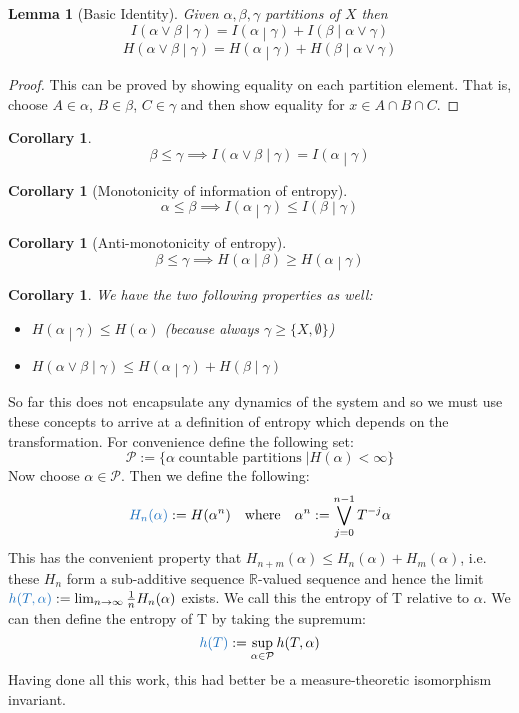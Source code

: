 \documentclass[11pt]{article}
\newcommand{\defeq}{:=}
\newcommand{\relmiddle}[1]{\mathrel{}\middle#1\mathrel{}}
\newcommand{\rmv}{\relmiddle|}
\newcommand{\R}{\mathbb{R}}
\newcommand{\gvn}[2]{\ensuremath{\left(#1\rmv#2\right)}}
\newcommand{\infog}[2]{\ensuremath{I\gvn{#1}{#2}}}
\newcommand{\entrg}[2]{\ensuremath{H\gvn{#1}{#2}}}
\newcommand{\mdf}[1]{{\color{RoyalBlue} #1}}
\newtheorem{lemma}[prop]{Lemma}
\newtheorem{cor}[prop]{Corollary}
\begin{document}
\begin{lemma}[Basic Identity]
	Given $\alpha,\beta,\gamma$ partitions of $X$ then
	$$\infog{\alpha\vee\beta}{\gamma}=\infog{\alpha}{\gamma}+\infog{\beta}{\alpha\vee\gamma}$$
	$$\entrg{\alpha\vee\beta}{\gamma}=\entrg{\alpha}{\gamma}+\entrg{\beta}{\alpha\vee\gamma}$$
\end{lemma}
\begin{proof}
This can be proved by showing equality on each partition element.
That is, choose $A\in \alpha$, $B\in \beta$, $C\in\gamma$ and then show equality for $x\in A \cap B \cap C$.
\end{proof}
\begin{cor}
	$$\beta\leq\gamma\implies\infog{\alpha\vee\beta}{\gamma}=\infog{\alpha}{\gamma}$$
\end{cor}
\begin{cor}[Monotonicity of information of entropy]
	$$\alpha\leq\beta\implies\infog{\alpha}{\gamma}\leq\infog{\beta}{\gamma}$$
\end{cor}
\begin{cor}[Anti-monotonicity of entropy]
	$$\beta\leq\gamma\implies\entrg{\alpha}{\beta}\geq\entrg{\alpha}{\gamma}$$
\end{cor}
\begin{cor}
We have the two following properties as well:
\begin{itemize}
	\item $\entrg{\alpha}{\gamma}\leq H(\alpha)$ (because always $\gamma\geq\{X,\emptyset\}$)
	\item $\entrg{\alpha\vee\beta}{\gamma}\leq\entrg{\alpha}{\gamma}+\entrg{\beta}{\gamma}$
\end{itemize}
\end{cor}
So far this does not encapsulate any dynamics of the system and so we must use these concepts to arrive at a definition of entropy which depends on the transformation. For convenience define the following set:
$$\mathcal{P}\defeq\{\alpha\;\text{countable partitions}\;|H(\alpha) < \infty\}$$
Now choose $\alpha\in\mathcal{P}$. Then we define the following:
$$\mdf{H_n(\alpha)}\defeq H(\alpha^n)\quad\text{where}\quad\alpha^n\defeq\bigvee_{j=0}^{n-1}T^{-j}\alpha$$
This has the convenient property that $H_{n+m}(\alpha)\leq H_n(\alpha)+H_m(\alpha)$, i.e. these $H_n$ form a sub-additive sequence $\R$-valued sequence and hence the limit $\mdf{h(T,\alpha)}\defeq\lim_{n\to\infty}\frac{1}{n}H_n(\alpha)$ exists. We call this the \mdf{entropy of T relative to $\alpha$}.
We can then define the \mdf{entropy of T} by taking the supremum:
$$\mdf{h(T)}\defeq\sup_{\alpha\in\mathcal{P}}h(T,\alpha)$$
Having done all this work, this had better be a measure-theoretic isomorphism invariant.
\end{document}
